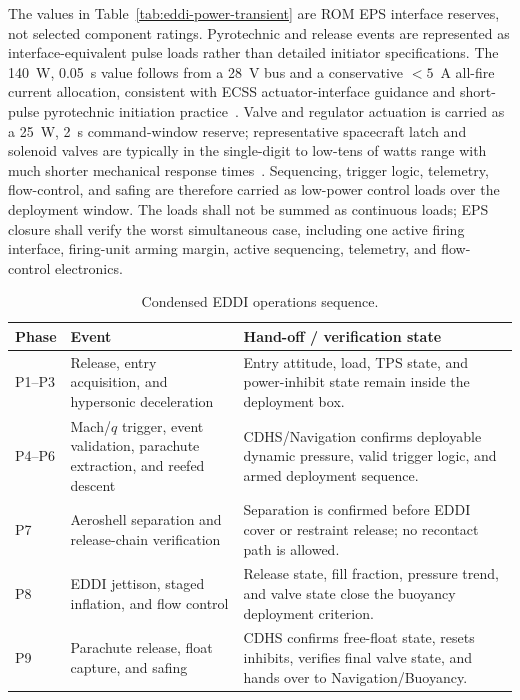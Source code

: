 The values in Table~\ref{tab:eddi-power-transient} are ROM EPS interface reserves, not selected component ratings. Pyrotechnic and release events are represented as interface-equivalent pulse loads rather than detailed initiator specifications. The 140~W, 0.05~s value follows from a 28~V bus and a conservative $<5$~A all-fire current allocation, consistent with ECSS actuator-interface guidance and short-pulse pyrotechnic initiation practice~\cite{ecss2019actuator,novotney2018networkedpyro}. Valve and regulator actuation is carried as a 25~W, 2~s command-window reserve; representative spacecraft latch and solenoid valves are typically in the single-digit to low-tens of watts range with much shorter mechanical response times~\cite{moog_latching_valves}. Sequencing, trigger logic, telemetry, flow-control, and safing are therefore carried as low-power control loads over the deployment window. The loads shall not be summed as continuous loads; EPS closure shall verify the worst simultaneous case, including one active firing interface, firing-unit arming margin, active sequencing, telemetry, and flow-control electronics.

\begin{table}[H]
\centering
\renewcommand{\arraystretch}{1}
\small
\caption{Condensed EDDI operations sequence.}
\label{tab:eddi-sequence}
\begin{tabularx}{\textwidth}{@{}p{} X X@{}}
\toprule
\textbf{Phase} & \textbf{Event} & \textbf{Hand-off / verification state} \\
\midrule
P1--P3
& Release, entry acquisition, and hypersonic deceleration
& Entry attitude, load, TPS state, and power-inhibit state remain inside the deployment box. \\

P4--P6
& Mach/$q$ trigger, event validation, parachute extraction, and reefed descent
& CDHS/Navigation confirms deployable dynamic pressure, valid trigger logic, and armed deployment sequence. \\

P7
& Aeroshell separation and release-chain verification
& Separation is confirmed before EDDI cover or restraint release; no recontact path is allowed. \\

P8
& EDDI jettison, staged inflation, and flow control
& Release state, fill fraction, pressure trend, and valve state close the buoyancy deployment criterion. \\

P9
& Parachute release, float capture, and safing
& CDHS confirms free-float state, resets inhibits, verifies final valve state, and hands over to Navigation/Buoyancy. \\
\bottomrule
\end{tabularx}
\end{table}

